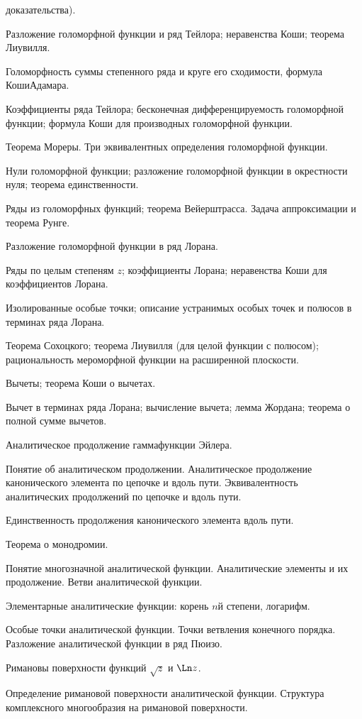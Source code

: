 \documentclass[a4paper]{article}
\begin{document}
\begin{nums}{-3}
доказательства).
\item Разложение голоморфной функции и ряд Тейлора; неравенства Коши; теорема
Лиувилля.
\item Голоморфность суммы степенного ряда и круге его сходимости, формула
Коши\ч Адамара.
\item Коэффициенты ряда Тейлора; бесконечная дифференцируемость голоморфной
функции; формула Коши для производных голоморфной функции.
\item Теорема Мореры. Три эквивалентных определения голоморфной функции.
\item Нули голоморфной функции; разложение голоморфной функции в окрестности
нуля; теорема единственности.
\item Ряды из голоморфных функций; теорема Вейерштрасса. Задача аппроксимации
и теорема Рунге.
\item Разложение голоморфной функции в ряд Лорана.
\item Ряды по целым степеням $z$; коэффициенты Лорана; неравенства Коши для
коэффициентов Лорана.
\item Изолированные особые точки; описание устранимых особых точек и полюсов в
терминах ряда Лорана.
\item Теорема Сохоцкого; теорема Лиувилля (для целой функции с полюсом);
рациональность мероморфной функции на расширенной плоскости.
\item Вычеты; теорема Коши о вычетах.
\item Вычет в терминах ряда Лорана; вычисление вычета; лемма Жордана; теорема
о полной сумме вычетов.
\item Аналитическое продолжение гамма\д функции Эйлера.
\item Понятие об аналитическом продолжении. Аналитическое продолжение
канонического элемента по цепочке и вдоль пути. Эквивалентность
аналитических продолжений по цепочке и вдоль пути.
\item Единственность продолжения канонического элемента вдоль пути.
\item Теорема о монодромии.
\item Понятие многозначной аналитической функции. Аналитические элементы и их
продолжение. Ветви аналитической функции.
\item Элементарные аналитические функции: корень $n$\д й степени, логарифм.
\item Особые точки аналитической функции. Точки ветвления конечного порядка.
Разложение аналитической функции в ряд Пюизо.
\item Римановы поверхности функций $\sqrt z$ и $\Ln z$.
\item Определение римановой поверхности аналитической функции. Структура
комплексного многообразия на римановой поверхности.
\end{nums}
\end{document}
